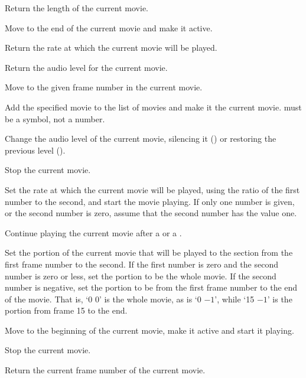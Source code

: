   Return the length of the current movie.

  Move to the end of the current movie and make it active.

  Return the rate at which the current movie will be played.

  Return the audio level for the current movie.

  Move to the given frame number in the current movie.

  Add the specified movie to the list of movies and make it the current movie.
   must be a symbol, not a number.

  Change the audio level of the current movie, silencing it () or restoring the previous
  level ().

  Stop the current movie.

  Set the rate at which the current movie will be played, using the ratio of the first number to the
  second, and start the movie playing.
  If only one number is given, or the second number is zero, assume that the second number has the
  value one.

  Continue playing the current movie after a  or a .

  Set the portion of the current movie that will be played to the section from the first frame number
  to the second.
  If the first number is zero and the second number is zero or less, set the portion to be the whole
  movie.
  If the second number is negative, set the portion to be from the first frame number to the end of
  the movie.
  That is, `0 0' is the whole movie, as is `0 $-1$', while `15 $-1$' is the portion from frame 15 to
  the end.

  Move to the beginning of the current movie, make it active and start it playing.

  Stop the current movie.

  Return the current frame number of the current movie.

